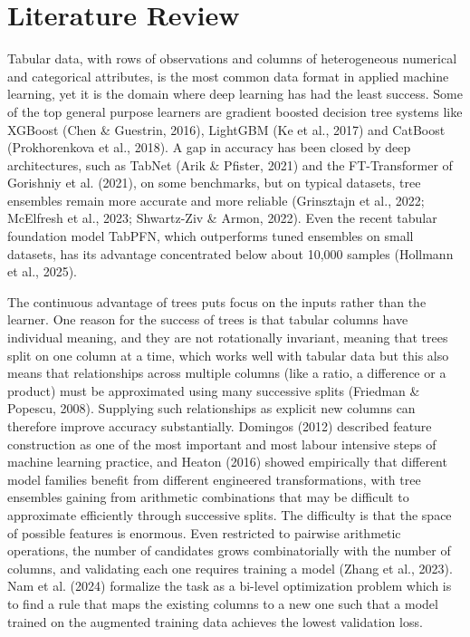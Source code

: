 \documentclass[11pt]{article}
\begin{document}
\section{Literature Review}\label{sec:lit}

Tabular data, with rows of observations and columns of heterogeneous numerical and categorical
attributes, is the most common data format in applied machine learning, yet it is the domain where
deep learning has had the least success. Some of the top general purpose learners are gradient
boosted decision tree systems like XGBoost (Chen \& Guestrin, 2016), LightGBM (Ke et al., 2017) and
CatBoost (Prokhorenkova et al., 2018). A gap in accuracy has been closed by deep architectures, such
as TabNet (Arik \& Pfister, 2021) and the FT-Transformer of Gorishniy et al. (2021), on some
benchmarks, but on typical datasets, tree ensembles remain more accurate and more reliable
(Grinsztajn et al., 2022; McElfresh et al., 2023; Shwartz-Ziv \& Armon, 2022). Even the recent
tabular foundation model TabPFN, which outperforms tuned ensembles on small datasets, has its
advantage concentrated below about 10,000 samples (Hollmann et al., 2025).

The continuous advantage of trees puts focus on the inputs rather than the learner. One reason for
the success of trees is that tabular columns have individual meaning, and they are not rotationally
invariant, meaning that trees split on one column at a time, which works well with tabular data but
this also means that relationships across multiple columns (like a ratio, a difference or a
product) must be approximated using many successive splits (Friedman \& Popescu, 2008). Supplying
such relationships as explicit new columns can therefore improve accuracy substantially. Domingos
(2012) described feature construction as one of the most important and most labour intensive steps
of machine learning practice, and Heaton (2016) showed empirically that different model families
benefit from different engineered transformations, with tree ensembles gaining from arithmetic
combinations that may be difficult to approximate efficiently through successive splits. The
difficulty is that the space of possible features is enormous. Even restricted to pairwise
arithmetic operations, the number of candidates grows combinatorially with the number of columns,
and validating each one requires training a model (Zhang et al., 2023). Nam et al. (2024) formalize
the task as a bi-level optimization problem which is to find a rule that maps the existing columns
to a new one such that a model trained on the augmented training data achieves the lowest
validation loss.
\end{document}
